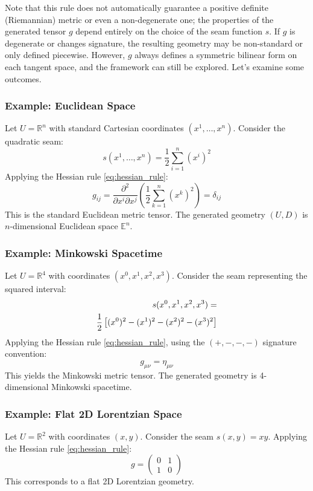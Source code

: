 \documentclass[twoside,twocolumn]{article}
\begin{document}
\noindent Note that this rule does not automatically guarantee a positive definite (Riemannian) metric or even a non-degenerate one; the properties of the generated tensor $g$ depend entirely on the choice of the seam function $s$. If $g$ is degenerate or changes signature, the resulting geometry may be non-standard or only defined piecewise. However, $g$ always defines a symmetric bilinear form on each tangent space, and the framework can still be explored. Let's examine some outcomes.

\subsubsection{Example: Euclidean Space}
Let $U = \mathbb{R}^n$ with standard Cartesian coordinates $(x^1, \dots, x^n)$. Consider the quadratic seam:
$$ s(x^1, \dots, x^n) = \frac{1}{2} \sum_{i=1}^n (x^i)^2 $$
Applying the Hessian rule \eqref{eq:hessian_rule}:
$$ g_{ij} = \frac{\partial^2}{\partial x^i \partial x^j} \left( \frac{1}{2} \sum_{k=1}^n (x^k)^2 \right) = \delta_{ij} $$
This is the standard Euclidean metric tensor. The generated geometry $(U, D)$ is $n$-dimensional Euclidean space $\mathbb{E}^n$.

\subsubsection{Example: Minkowski Spacetime}
Let $U = \mathbb{R}^4$ with coordinates $(x^0, x^1, x^2, x^3)$. Consider the seam representing the squared interval:
\begin{align}
s(x^0, x^1, x^2, x^3) = \notag \\ \frac{1}{2} \left[ (x^0)^2 - (x^1)^2 - (x^2)^2 - (x^3)^2 \right]
\end{align}
Applying the Hessian rule \eqref{eq:hessian_rule}, using the $(+,-,-,-)$ signature convention:
$$ g_{\mu\nu} = \eta_{\mu\nu} $$
This yields the Minkowski metric tensor. The generated geometry is 4-dimensional Minkowski spacetime.

\subsubsection{Example: Flat 2D Lorentzian Space}
Let $U = \mathbb{R}^2$ with coordinates $(x, y)$. Consider the seam $s(x, y) = xy$. Applying the Hessian rule \eqref{eq:hessian_rule}:
$$ g = \begin{pmatrix} 0 & 1 \\ 1 & 0 \end{pmatrix} $$
This corresponds to a flat 2D Lorentzian geometry.
\end{document}
